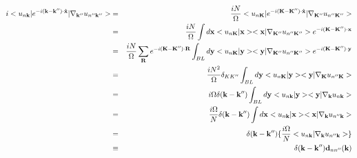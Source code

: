 \documentclass[aps,prb,preprint]{revtex4-1}
\begin{document}
\begin{appendix}
%
\begin{eqnarray}
i <u_{n{\bf k}}| e^{-i{\bf (k-k'' )\cdot \hat{x}} }|\nabla_{\bf k''} u_{n''{\bf k''}}> &=& \frac{iN}{\Omega} <u_{n{\bf K}}| e^{-i{\bf (K-K'' )\cdot \hat{x}} }|{\bf \nabla}_{\bf K''} u_{n''{\bf K''}}> \nonumber  \\
&=& \frac{iN}{\Omega} \int d{\bf x} <u_{n{\bf K}}|{\bf x}> <{\bf x}|\nabla_{\bf K''} u_{n''{\bf K''}}> e^{-i{\bf (K-K'' )\cdot {x}} }\nonumber \\
&=& \frac{iN}{\Omega} \sum_{\bf R} e^{-i{\bf (K-K'' )\cdot {\bf R}} } \int_{BL} d{\bf y} <u_{n{\bf K}}|{\bf y}> <{\bf y}|\nabla_{\bf K''} u_{n''{\bf K''}}> e^{-i{\bf (K-K'' )\cdot {y}} } \nonumber \\
&=& \frac{iN^2}{\Omega} \delta_{KK''}  \int_{BL} d{\bf y} <u_{n{\bf K}}|{\bf y}> <{\bf y}|\nabla_{\bf K} u_{n''{\bf K}}> \nonumber \\
&=& i \Omega \delta({\bf k-k''})  \int_{BL} d{\bf y}  <u_{n{\bf k}}|{\bf y}> <{\bf y}|\nabla_{\bf k} u_{n{\bf k}}> \nonumber \\
&=& \frac{i\Omega}{N} \delta({\bf k-k''})  \int d{\bf x} <u_{n{\bf k}}|{\bf x}> <{\bf x}|\nabla_{\bf k} u_{n''{\bf k}}> \nonumber \\
&=& \delta({\bf k-k''}) \{ \frac{i \Omega}{N} <u_{n{\bf k}}|\nabla_{\bf k} u_{n''{\bf k}}>  \}\nonumber \\
&\equiv& \delta({\bf k-k''}) {\bf d}_{nn''}({\bf k})
 \end{eqnarray} 
 

\end{appendix}
\end{document}
